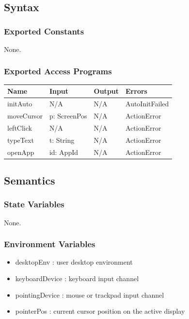 \documentclass[12pt, titlepage]{article}
\begin{document}
\subsection{Syntax}

\subsubsection{Exported Constants}

None.

\subsubsection{Exported Access Programs}

\begin{center}
\begin{tabular}{p{2.7cm} p{4cm} p{4cm} p{2.5cm}}
\hline
\textbf{Name} & \textbf{Input} & \textbf{Output} & \textbf{Errors} \\
\hline
initAuto & N/A & N/A & AutoInitFailed \\
moveCursor & p: ScreenPos & N/A & ActionError \\
leftClick & N/A & N/A & ActionError \\
typeText & t: String & N/A & ActionError \\
openApp & id: AppId & N/A & ActionError \\
\hline
\end{tabular}
\end{center}

\subsection{Semantics}

\subsubsection{State Variables}

None.

\subsubsection{Environment Variables}

\begin{itemize}
  \item desktopEnv : user desktop environment
  \item keyboardDevice : keyboard input channel
  \item pointingDevice : mouse or trackpad input channel
  \item pointerPos : current cursor position on the active display
\end{itemize}
\end{document}
